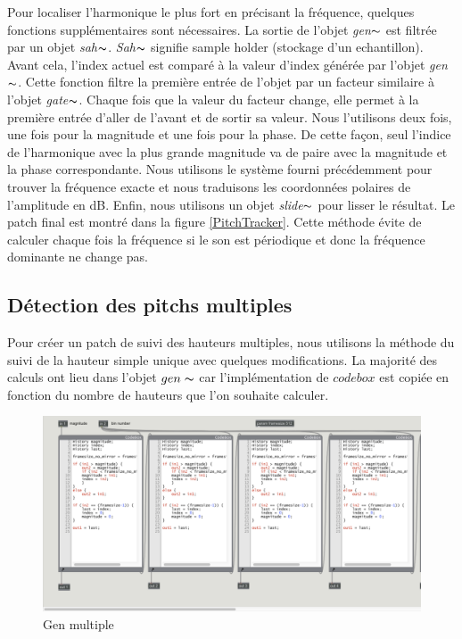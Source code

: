 Pour localiser l’harmonique le plus fort en précisant la fréquence, quelques fonctions supplémentaires sont nécessaires. La sortie de l'objet \textit{gen}$\thicksim $ est filtrée par un objet \textit{sah}$ \thicksim $. \textit{Sah}$\thicksim $ signifie  \guillemotleft sample holder \guillemotright (stockage d'un echantillon). Avant cela, l'index actuel est comparé à la valeur d'index générée par l'objet \textit{gen}$\thicksim $.  Cette fonction filtre la première entrée de l'objet par un facteur similaire à l'objet \textit{gate}$\thicksim $. Chaque fois que la valeur du facteur change, elle permet à la première entrée d'aller de l'avant et de sortir sa valeur. Nous l'utilisons deux fois, une fois pour la magnitude et une fois pour la phase. De cette façon, seul l’indice de l'harmonique avec la plus grande magnitude va de paire avec la magnitude et la phase correspondante. Nous utilisons le système fourni précédemment pour trouver la fréquence exacte et nous traduisons les coordonnées polaires de l'amplitude en dB. Enfin, nous utilisons un objet \textit{slide}$\thicksim $ pour lisser le résultat. Le patch final est montré dans la figure \ref{PitchTracker}. Cette méthode évite de calculer chaque fois la fréquence si le son est périodique et donc la fréquence dominante ne change pas.

\subsection{Détection des pitchs multiples}

Pour créer un patch de suivi des hauteurs multiples, nous utilisons la méthode du suivi de la hauteur simple unique avec quelques modifications. La majorité des calculs ont lieu dans l'objet $ gen \thicksim $ car l'implémentation de $ codebox $ est copiée en fonction du nombre de hauteurs que l'on souhaite calculer.

    \begin{figure}
        \centering
        \includegraphics[width = \textwidth]{Graphs/GenMultiple.png}
        \caption{Gen multiple}
        \label{GenMultiple}
    \end{figure}

